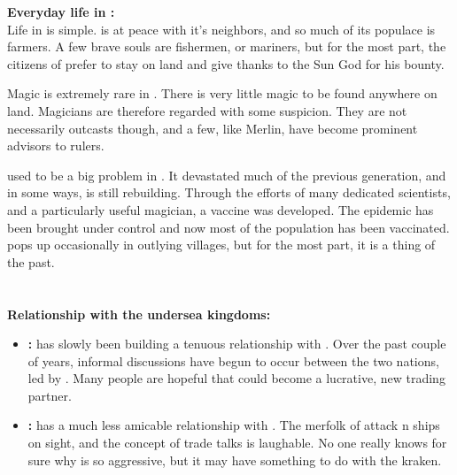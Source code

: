 \documentclass[blue]{NeptuneBall}
\begin{document}
{\bf Everyday life in \pAmerica{}:}\\
Life in \pAmerica{} is simple. \pAmerica{} is at peace with it's neighbors, and so much of its populace is farmers. A few brave souls are fishermen, or mariners,  but for the most part, the citizens of \pAmerica{} prefer to stay on land and give thanks to the Sun God for his bounty.

Magic is extremely rare in \pAmerica{}. There is very little magic to be found anywhere on land. Magicians are therefore regarded with some suspicion. They are not necessarily outcasts though, and a few, like Merlin, have become prominent advisors to rulers.

\cPolio{} used to be a big problem in \pAmerica{}. It devastated much of the previous generation, and in some ways, \pAmerica{} is still rebuilding. Through the efforts of many dedicated scientists, and a particularly useful magician, a vaccine was developed. The epidemic has been brought under control and now most of the population has been vaccinated. \cPolio{} pops up occasionally in outlying villages, but for the most part, it is a thing of the past.\\ \\ \\

{\bf Relationship with the undersea kingdoms:}
\begin{itemize}
  \item {\bf \pAtlantis{}:} \pAmerica{} has slowly been building a tenuous relationship with \pAtlantis{}. Over the past couple of years, informal discussions  have begun to occur between the two nations, led by \cAriel{\King} \cAriel{}. Many people are hopeful that \pAtlantis{} could become a lucrative, new trading partner.
  \item {\bf \pPacifica{}:} \pAmerica{} has a much less amicable relationship with \pPacifica{}. The merfolk of \pPacifica{} attack \pAmerica{}n ships on sight, and the concept of trade talks is laughable. No one really knows for sure why \pPacifica{} is so aggressive, but it may have something to do with the kraken.
\end{itemize}
\end{document}
